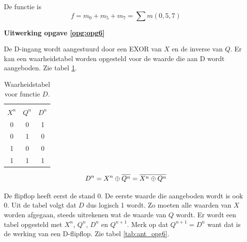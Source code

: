 \documentclass[a4paper,12pt,addpoints,fleqn,dutch,concept]{tisdexam}
\newcommand*{\oline}[1]{\overline{#1\mathstrut}}
\begin{document}
\begin{questions}
De functie is
\begin{equation*}
f = m_{0} + m_{5} + m_{7} = \sum m(0,5,7)
\end{equation*}


\vspace{1em}

\textbf{Uitwerking opgave \ref{opg:opg6}}

De D-ingang wordt aangestuurd door een EXOR van $X$ en de inverse van $Q$. Er
kan een waarheidstabel worden opgesteld voor de waarde die aan D wordt
aangeboden. Zie tabel \ref{tab:opg6_xor}.

\begin{table}[H]
  \begin{minipage}[c]{0.40\linewidth}
    \caption{Waarheidstabel voor functie $D$.}
    \label{tab:opg6_xor}
	\begin{tabular}{c c | c}
	\hline
              &         &               \\ [-2.9ex]
      $X^{n}$ & $Q^{n}$ & $D^{n}$       \\ \hline
        0     &   0     &   1           \\
        0     &   1     &   0           \\
        1     &   0     &   0           \\
        1     &   1     &   1           \\ \hline
	\end{tabular}	    
  \end{minipage}
  \begin{minipage}[c]{.60\linewidth}
  \begin{equation}
  \nonumber D^{n} = X^{n} \oplus \oline{Q^{n}} = \oline{X^{n} \oplus Q^{n}}
  \end{equation}
  \end{minipage}\hfill
\end{table}

De flipflop heeft eerst de stand 0. De eerste waarde die aangeboden wordt is
ook 0. Uit de tabel volgt dat $D$ dus logisch 1 wordt. Zo moeten alle waarden
van $X$ worden afgegaan, steeds uitrekenen wat de waarde van $Q$ wordt. Er
wordt een tabel opgesteld met $X^{n}$, $Q^{n}$, $D^{n}$ en $Q^{n+1}$. Merk op
dat $Q^{n+1} = D^{n}$ want dat is de werking van een D-flipflop. Zie tabel
\ref{tab:ant_opg6}.


\end{questions}
\end{document}
